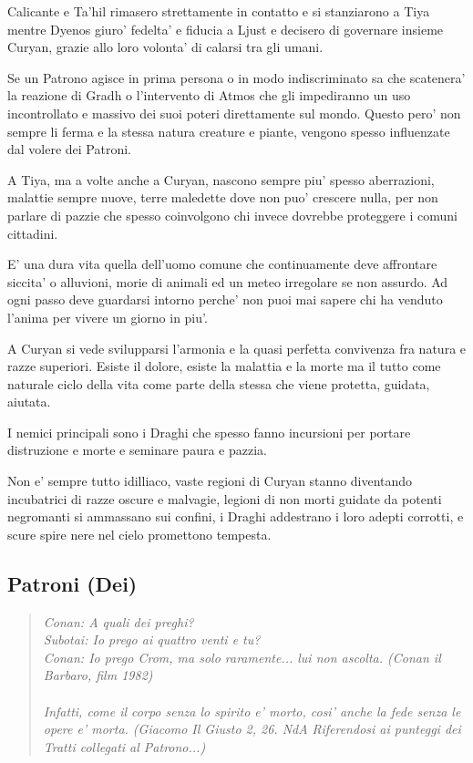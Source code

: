 \documentclass[a4paper,11pt,twoside,openany]{book}
\begin{document}
{		Calicante e Ta'hil rimasero strettamente in contatto e si stanziarono a Tiya mentre Dyenos giuro' fedelta' e fiducia a Ljust e decisero di governare insieme Curyan, grazie allo loro volonta' di calarsi tra gli umani.
		
		Se un Patrono agisce in prima persona o in modo indiscriminato sa che scatenera' la reazione di Gradh o l'intervento di Atmos che gli impediranno un uso incontrollato e massivo dei suoi poteri direttamente sul mondo. Questo pero' non sempre li ferma e la stessa natura creature e piante, vengono spesso influenzate dal volere dei Patroni.
		
		A Tiya, ma a volte anche a Curyan, nascono sempre piu' spesso aberrazioni, malattie sempre nuove, terre maledette dove non puo' crescere nulla, per non parlare di pazzie che spesso coinvolgono chi invece dovrebbe proteggere i comuni cittadini.
		
		E' una dura vita quella dell'uomo comune che continuamente deve affrontare siccita' o alluvioni, morie di animali ed un meteo irregolare se non assurdo. Ad ogni passo deve guardarsi intorno perche' non puoi mai sapere chi ha venduto l'anima per vivere un giorno in piu'.
		
		A Curyan si vede svilupparsi l'armonia e la quasi perfetta convivenza fra natura e razze superiori. Esiste il dolore, esiste la malattia e la morte ma il tutto come naturale ciclo della vita come parte della stessa che viene protetta, guidata, aiutata.
		
		I nemici principali sono i Draghi che spesso fanno incursioni per portare distruzione e morte e seminare paura e pazzia.
		
		Non e' sempre tutto idilliaco, vaste regioni di Curyan stanno diventando incubatrici di razze oscure e malvagie, legioni di non morti guidate da potenti negromanti si ammassano sui confini, i Draghi addestrano i loro adepti corrotti, e scure spire nere nel cielo promettono tempesta.
		
		\pagebreak
		
		\subsection{Patroni (Dei)}
		
		\label{patroni-dei}
		\begin{quote}\textit{
				Conan: A quali dei preghi?\\
				Subotai: Io prego ai quattro venti e tu?\\
				Conan: Io prego Crom, ma solo raramente... lui non ascolta. (Conan il Barbaro, film 1982)\\\\
				Infatti, come il corpo senza lo spirito e' morto, cosi' anche la fede senza le opere e' morta. (Giacomo Il Giusto 2, 26. NdA Riferendosi ai punteggi dei Tratti collegati al Patrono...)}\end{quote}
		
}
\end{document}
